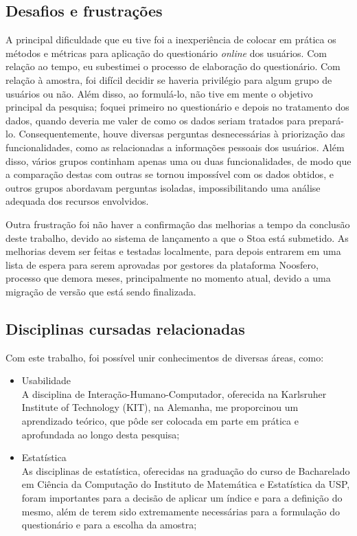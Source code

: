 \subsection{Desafios e frustrações}

    A principal dificuldade que eu tive foi a inexperiência de colocar em prática os métodos e métricas para aplicação do questionário \emph{online} dos usuários. Com relação ao tempo, eu subestimei o processo de elaboração do questionário. Com relação à amostra, foi difícil decidir se haveria privilégio para algum grupo de usuários ou não. Além disso, ao formulá-lo, não tive em mente o objetivo principal da pesquisa; foquei primeiro no questionário e depois no tratamento dos dados, quando deveria me valer de como os dados seriam tratados para prepará-lo. Consequentemente, houve diversas perguntas desnecessárias à priorização das funcionalidades, como as relacionadas a informações pessoais dos usuários. Além disso, vários grupos continham apenas uma ou duas funcionalidades, de modo que a comparação destas com outras se tornou impossível com os dados obtidos, e outros grupos abordavam perguntas isoladas, impossibilitando uma análise adequada dos recursos envolvidos.
    
    Outra frustração foi não haver a confirmação das melhorias a tempo da conclusão deste trabalho, devido ao sistema de lançamento a que o Stoa está submetido. As melhorias devem ser feitas e testadas localmente, para depois entrarem em uma lista de espera para serem aprovadas por gestores da plataforma Noosfero, processo que demora meses, principalmente no momento atual, devido a uma migração de versão que está sendo finalizada.

\subsection{Disciplinas cursadas relacionadas}

    Com este trabalho, foi possível unir conhecimentos de diversas áreas, como:
    \begin{itemize}
    \item Usabilidade\\
    A disciplina de Interação-Humano-Computador, oferecida na Karlsruher Institute of Technology (KIT), na Alemanha, me proporcinou um aprendizado teórico, que pôde ser colocada em parte em prática e aprofundada ao longo desta pesquisa;
    \item Estatística\\
    As disciplinas de estatística, oferecidas na graduação do curso de Bacharelado em Ciência da Computação do Instituto de Matemática e Estatística da USP, foram importantes para a decisão de aplicar um índice e para a definição do mesmo, além de terem sido extremamente necessárias para a formulação do questionário e para a escolha da amostra;
    \end{itemize} 


